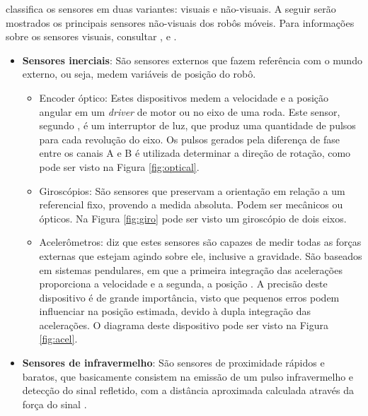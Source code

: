  classifica os sensores em duas variantes: visuais e não-visuais. 
A seguir serão mostrados os principais sensores não-visuais 
dos robôs móveis. Para informações sobre os sensores visuais, consultar \cite{dudek_mobile}, \cite{Intro_auto} e \cite{secchi2012}.

\begin{itemize}
 \item[] \textbf{Sensores inerciais}: São sensores externos que fazem referência com o mundo externo, ou seja, medem variáveis de 
posição do robô.
  \begin{itemize}
   \item Encoder óptico: Estes dispositivos medem a velocidade e a posição angular em um \textit{driver} de motor ou no eixo de uma 
   roda. Este sensor, segundo , é um interruptor de luz, que produz uma quantidade de pulsos para cada revolução 
   do eixo. Os pulsos gerados pela diferença de fase entre os canais A e B é utilizada determinar a direção de rotação, como pode 
   ser visto na Figura \ref{fig:optical}.
   
   \item Giroscópios: São sensores que preservam a orientação em relação a um referencial fixo, provendo a medida absoluta. Podem ser 
   mecânicos ou ópticos. Na Figura \ref{fig:giro} pode ser visto um giroscópio de dois eixos.
   
   \item Acelerômetros:  diz que estes sensores são capazes de medir todas as forças externas que estejam 
   agindo sobre ele, inclusive a gravidade. 
   São baseados em sistemas pendulares, em que a primeira integração das acelerações proporciona a velocidade e a 
   segunda, a posição \cite{secchi2012}. A precisão deste dispositivo é de grande importância, visto que pequenos erros podem 
   influenciar na posição estimada, devido à dupla integração das acelerações. O diagrama deste dispositivo pode ser visto na Figura 
   \ref{fig:acel}.
  \end{itemize}
  
 \item[] \textbf{Sensores de infravermelho}: São sensores de proximidade rápidos e baratos, que basicamente consistem na emissão de 
 um pulso infravermelho e detecção do sinal refletido, com a distância aproximada calculada através da 
 força do sinal \cite{dudek_mobile}.

\end{itemize}



